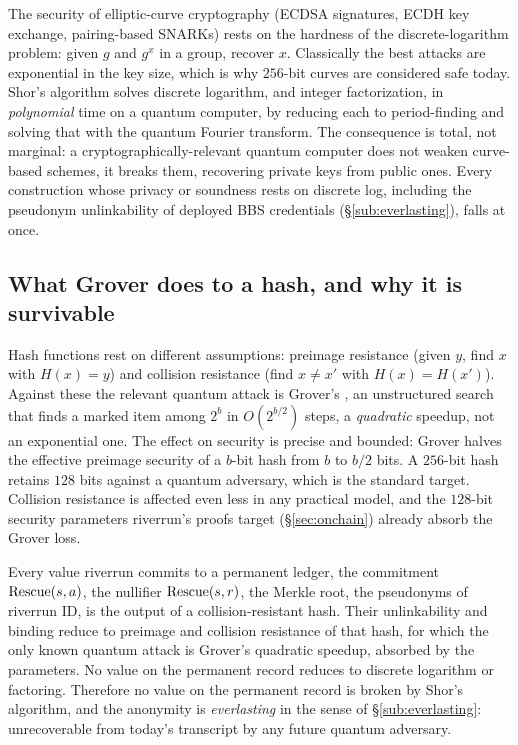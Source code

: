 \documentclass[11pt]{article}
\begin{document}
The security of elliptic-curve cryptography (ECDSA signatures, ECDH key exchange,
pairing-based SNARKs) rests on the hardness of the discrete-logarithm problem: given
$g$ and $g^x$ in a group, recover $x$. Classically the best attacks are exponential in
the key size, which is why $256$-bit curves are considered safe today. Shor's algorithm
\cite{shor} solves discrete logarithm, and integer factorization, in \emph{polynomial}
time on a quantum computer, by reducing each to period-finding and solving that with the
quantum Fourier transform. The consequence is total, not marginal: a
cryptographically-relevant quantum computer does not weaken curve-based schemes, it
breaks them, recovering private keys from public ones. Every construction whose privacy
or soundness rests on discrete log, including the pseudonym unlinkability of deployed BBS
credentials (\S\ref{sub:everlasting}), falls at once.

\subsection{What Grover does to a hash, and why it is survivable}

Hash functions rest on different assumptions: preimage resistance (given $y$, find $x$
with $H(x) = y$) and collision resistance (find $x \ne x'$ with $H(x) = H(x')$). Against
these the relevant quantum attack is Grover's \cite{grover}, an unstructured search that
finds a marked item among $2^b$ in $O(2^{b/2})$ steps, a \emph{quadratic} speedup, not an
exponential one. The effect on security is precise and bounded: Grover halves the
effective preimage security of a $b$-bit hash from $b$ to $b/2$ bits. A $256$-bit hash
retains $128$ bits against a quantum adversary, which is the standard target. Collision
resistance is affected even less in any practical model, and the $128$-bit security
parameters riverrun's proofs target (\S\ref{sec:onchain}) already absorb the Grover loss.

\begin{claimx}
Every value riverrun commits to a permanent ledger, the commitment $\mathrm{Rescue}(s,a)$, the
nullifier $\mathrm{Rescue}(s,r)$, the Merkle root, the pseudonyms of riverrun ID, is the output of
a collision-resistant hash. Their unlinkability and binding reduce to preimage and
collision resistance of that hash, for which the only known quantum attack is Grover's
quadratic speedup, absorbed by the parameters. No value on the permanent record reduces
to discrete logarithm or factoring. Therefore no value on the permanent record is broken
by Shor's algorithm, and the anonymity is \emph{everlasting} in the sense of
\S\ref{sub:everlasting}: unrecoverable from today's transcript by any future quantum
adversary.
\end{claimx}
\end{document}
